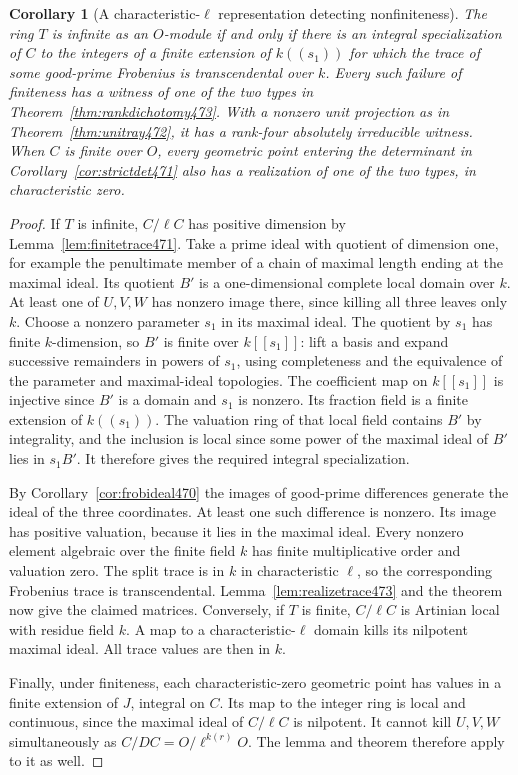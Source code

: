 \documentclass[a4paper,11pt]{article}
\newtheorem{corollary}[proposition]{Corollary}
\theoremstyle{definition}
\theoremstyle{remark}
\numberwithin{equation}{section}
\begin{document}
\begin{corollary}[A characteristic-\(\ell\) representation detecting nonfiniteness]\leavevmode
\label{cor:finitecurve473}
The ring \(T\) is infinite as an \(O\)-module if and only if there
is an integral specialization of \(C\) to the integers of a finite
extension of \(k((s_1))\) for which the trace of some good-prime
Frobenius is transcendental over \(k\). Every such failure of
finiteness has a witness of one of the two types in
Theorem~\ref{thm:rankdichotomy473}. With a nonzero unit projection
as in Theorem~\ref{thm:unitray472}, it has a rank-four absolutely
irreducible witness. When \(C\) is finite over \(O\), every geometric
point entering the determinant in Corollary~\ref{cor:strictdet471}
also has a realization of one of the two types, in characteristic
zero.
\end{corollary}
\begin{proof}
If \(T\) is infinite, \(C/\ell C\) has positive dimension by
Lemma~\ref{lem:finitetrace471}. Take a prime ideal with quotient
of dimension one, for example the penultimate member of a chain
of maximal length ending at the maximal ideal. Its quotient \(B'\)
is a one-dimensional complete local domain over \(k\). At least
one of \(U,V,W\) has nonzero image there, since killing all three
leaves only \(k\). Choose a nonzero parameter \(s_1\) in its
maximal ideal. The quotient by \(s_1\) has finite \(k\)-dimension,
so \(B'\) is finite over \(k[[s_1]]\): lift a basis and expand
successive remainders in powers of \(s_1\), using completeness
and the equivalence of the parameter and maximal-ideal topologies.
The coefficient map on \(k[[s_1]]\) is injective since \(B'\) is
a domain and \(s_1\) is nonzero. Its fraction field is a finite
extension of \(k((s_1))\). The valuation ring of that local field
contains \(B'\) by integrality, and the inclusion is local since
some power of the maximal ideal of \(B'\) lies in \(s_1B'\).
It therefore gives the required integral specialization.

By Corollary~\ref{cor:frobideal470} the images of good-prime
differences generate the ideal of the three coordinates. At
least one such difference is nonzero. Its image has positive
valuation, because it lies in the maximal ideal. Every nonzero
element algebraic over the finite field \(k\) has finite
multiplicative order and valuation zero. The split trace is in
\(k\) in characteristic \(\ell\), so the corresponding Frobenius
trace is transcendental. Lemma~\ref{lem:realizetrace473} and the
theorem now give the claimed matrices. Conversely, if \(T\) is
finite, \(C/\ell C\) is Artinian local with residue field \(k\).
A map to a characteristic-\(\ell\) domain kills its nilpotent
maximal ideal. All trace values are then in \(k\).

Finally, under finiteness, each characteristic-zero geometric
point has values in a finite extension of \(J\), integral on
\(C\). Its map to the integer ring is local and continuous,
since the maximal ideal of \(C/\ell C\) is nilpotent. It cannot
kill \(U,V,W\) simultaneously as \(C/DC=O/\ell^{k(r)}O\).
The lemma and theorem therefore apply to it as well.
\end{proof}
\end{document}
